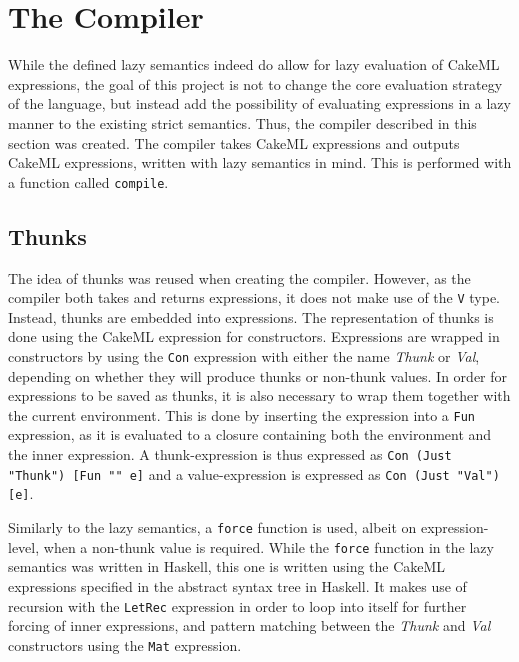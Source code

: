 \chapter{The Compiler}

While the defined lazy semantics indeed do allow for lazy evaluation of CakeML
expressions, the goal of this project is not to change the core evaluation
strategy of the language, but instead add the possibility of evaluating
expressions in a lazy manner to the existing strict semantics.
Thus, the compiler described in this section was
created. The compiler takes CakeML expressions and outputs CakeML expressions,
written with lazy semantics in mind. This is performed with a function called
\texttt{compile}.

\section{Thunks}
The idea of thunks was reused when creating the compiler. However, as the
compiler both takes and returns expressions, it does not make use of the
\texttt{V} type. Instead, thunks are embedded into expressions.
The representation of thunks is done using the CakeML expression for
constructors. Expressions are wrapped in constructors by using the
\texttt{Con} expression with either the name
\textit{Thunk} or \textit{Val}, depending on whether they will produce thunks or
non-thunk values. In order for expressions to be saved as thunks, it is also
necessary to wrap them together with the current environment. This is done by
inserting the expression into a \texttt{Fun} expression, as it is evaluated to a
closure containing both the environment and the inner expression. A
thunk-expression is thus expressed as \texttt{Con (Just "Thunk") [Fun "" e]} and
a value-expression is expressed as \texttt{Con (Just "Val") [e]}.

Similarly to the lazy semantics, a \texttt{force} function is used, albeit on
expression-level, when a non-thunk value is required.
While the \texttt{force} function in the lazy
semantics was written in Haskell, this one is written using the CakeML
expressions specified in the abstract syntax tree in Haskell. It makes use of
recursion with the \texttt{LetRec} expression in order to loop into itself for
further forcing of inner expressions, and pattern matching between the
\textit{Thunk} and \textit{Val} constructors using the \texttt{Mat} expression.

